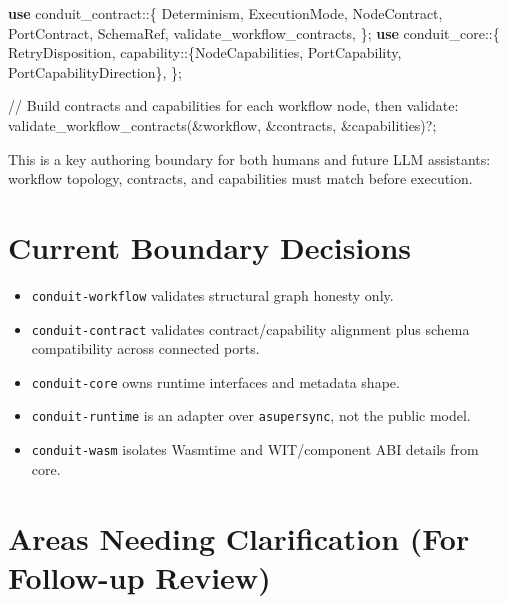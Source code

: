 \documentclass[
  letterpaper,
]{report}
\newenvironment{Shaded}{\begin{snugshade}}{\end{snugshade}}
\newcommand{\CommentTok}[1]{\textcolor[rgb]{0.37,0.37,0.37}{#1}}
\newcommand{\KeywordTok}[1]{\textcolor[rgb]{0.00,0.23,0.31}{\textbf{#1}}}
\newcommand{\NormalTok}[1]{\textcolor[rgb]{0.00,0.23,0.31}{#1}}
\newcommand{\OperatorTok}[1]{\textcolor[rgb]{0.37,0.37,0.37}{#1}}
\newcommand{\PreprocessorTok}[1]{\textcolor[rgb]{0.68,0.00,0.00}{#1}}
\providecommand{\tightlist}{%
  \setlength{\itemsep}{0pt}\setlength{\parskip}{0pt}}
\begin{document}
\begin{Shaded}
\begin{Highlighting}[]
\KeywordTok{use} \PreprocessorTok{conduit\_contract::}\OperatorTok{\{}
\NormalTok{    Determinism}\OperatorTok{,}\NormalTok{ ExecutionMode}\OperatorTok{,}\NormalTok{ NodeContract}\OperatorTok{,}\NormalTok{ PortContract}\OperatorTok{,}\NormalTok{ SchemaRef}\OperatorTok{,}
\NormalTok{    validate\_workflow\_contracts}\OperatorTok{,}
\OperatorTok{\};}
\KeywordTok{use} \PreprocessorTok{conduit\_core::}\OperatorTok{\{}
\NormalTok{    RetryDisposition}\OperatorTok{,}
    \PreprocessorTok{capability::}\OperatorTok{\{}\NormalTok{NodeCapabilities}\OperatorTok{,}\NormalTok{ PortCapability}\OperatorTok{,}\NormalTok{ PortCapabilityDirection}\OperatorTok{\},}
\OperatorTok{\};}

\CommentTok{// Build contracts and capabilities for each workflow node, then validate:}
\NormalTok{validate\_workflow\_contracts(}\OperatorTok{\&}\NormalTok{workflow}\OperatorTok{,} \OperatorTok{\&}\NormalTok{contracts}\OperatorTok{,} \OperatorTok{\&}\NormalTok{capabilities)}\OperatorTok{?;}
\end{Highlighting}
\end{Shaded}

This is a key authoring boundary for both humans and future LLM
assistants: workflow topology, contracts, and capabilities must match
before execution.

\section{Current Boundary Decisions}\label{current-boundary-decisions}

\begin{itemize}
\tightlist
\item
  \texttt{conduit-workflow} validates structural graph honesty only.
\item
  \texttt{conduit-contract} validates contract/capability alignment plus
  schema compatibility across connected ports.
\item
  \texttt{conduit-core} owns runtime interfaces and metadata shape.
\item
  \texttt{conduit-runtime} is an adapter over \texttt{asupersync}, not
  the public model.
\item
  \texttt{conduit-wasm} isolates Wasmtime and WIT/component ABI details
  from core.
\end{itemize}

\section{Areas Needing Clarification (For Follow-up
Review)}\label{areas-needing-clarification-for-follow-up-review}
\end{document}
